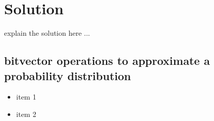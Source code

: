\section{Solution}
\label{sec:solution}

explain the solution here ...

\subsection{bitvector operations to approximate a probability distribution}

\begin{itemize}
	\item item 1
	
	\item item 2
\end{itemize}

